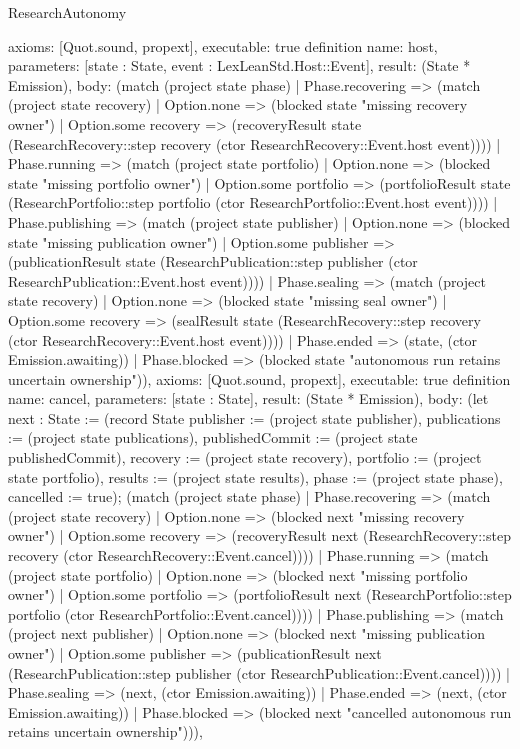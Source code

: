 \begin{lexlean}{ResearchAutonomy}
\begin{semanticmodule}
{ axioms: [Quot.sound, propext],
 executable: true
}
definition{
 name: host,
 parameters: [state : State, event : LexLeanStd.Host::Event],
 result: (State * Emission),
 body: (match (project state phase) | Phase.recovering => (match (project state recovery) | Option.none => (blocked state "missing recovery owner") | Option.some recovery => (recoveryResult state (ResearchRecovery::step recovery (ctor ResearchRecovery::Event.host event)))) | Phase.running => (match (project state portfolio) | Option.none => (blocked state "missing portfolio owner") | Option.some portfolio => (portfolioResult state (ResearchPortfolio::step portfolio (ctor ResearchPortfolio::Event.host event)))) | Phase.publishing => (match (project state publisher) | Option.none => (blocked state "missing publication owner") | Option.some publisher => (publicationResult state (ResearchPublication::step publisher (ctor ResearchPublication::Event.host event)))) | Phase.sealing => (match (project state recovery) | Option.none => (blocked state "missing seal owner") | Option.some recovery => (sealResult state (ResearchRecovery::step recovery (ctor ResearchRecovery::Event.host event)))) | Phase.ended => (state, (ctor Emission.awaiting)) | Phase.blocked => (blocked state "autonomous run retains uncertain ownership")),
 axioms: [Quot.sound, propext],
 executable: true
}
definition{
 name: cancel,
 parameters: [state : State],
 result: (State * Emission),
 body: (let next : State := (record State {publisher := (project state publisher), publications := (project state publications), publishedCommit := (project state publishedCommit), recovery := (project state recovery), portfolio := (project state portfolio), results := (project state results), phase := (project state phase), cancelled := true}); (match (project state phase) | Phase.recovering => (match (project state recovery) | Option.none => (blocked next "missing recovery owner") | Option.some recovery => (recoveryResult next (ResearchRecovery::step recovery (ctor ResearchRecovery::Event.cancel)))) | Phase.running => (match (project state portfolio) | Option.none => (blocked next "missing portfolio owner") | Option.some portfolio => (portfolioResult next (ResearchPortfolio::step portfolio (ctor ResearchPortfolio::Event.cancel)))) | Phase.publishing => (match (project next publisher) | Option.none => (blocked next "missing publication owner") | Option.some publisher => (publicationResult next (ResearchPublication::step publisher (ctor ResearchPublication::Event.cancel)))) | Phase.sealing => (next, (ctor Emission.awaiting)) | Phase.ended => (next, (ctor Emission.awaiting)) | Phase.blocked => (blocked next "cancelled autonomous run retains uncertain ownership"))),
}
\end{semanticmodule}
\end{lexlean}
